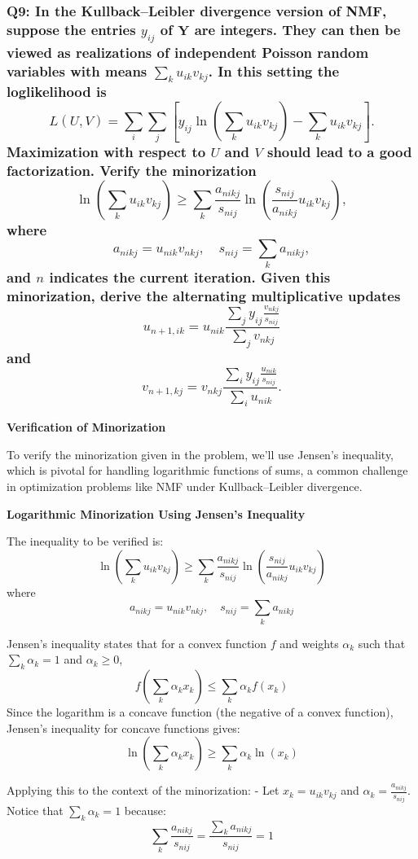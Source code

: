 \documentclass[8pt]{article}
\begin{document}
{\subsubsection*{Q9: In the Kullback–Leibler divergence version of NMF, suppose the entries \(y_{ij}\) of \(\mathbf{Y}\) are integers. They can then be viewed as realizations of independent Poisson random variables with means \(\sum_k u_{ik}v_{kj}\). In this setting the loglikelihood is
\[
L(U, V) = \sum_i \sum_j \left[ y_{ij} \ln \left( \sum_k u_{ik}v_{kj} \right) - \sum_k u_{ik}v_{kj} \right].
\]
\noindent Maximization with respect to \(U\) and \(V\) should lead to a good factorization. Verify the minorization
\[
\ln \left( \sum_k u_{ik}v_{kj} \right) \geq \sum_k \frac{a_{nikj}}{s_{nij}} \ln \left( \frac{s_{nij}}{a_{nikj}} u_{ik}v_{kj} \right),
\]
\noindent where
\[
a_{nikj} = u_{nik}v_{nkj}, \quad s_{nij} = \sum_k a_{nikj},
\]
\noindent and \(n\) indicates the current iteration. Given this minorization, derive the alternating multiplicative updates
\[
u_{n+1,ik} = u_{nik} \frac{\sum_j y_{ij} \frac{v_{nkj}}{s_{nij}}}{\sum_j v_{nkj}}
\]
\noindent and
\[
v_{n+1,kj} = v_{nkj} \frac{\sum_i y_{ij} \frac{u_{nik}}{s_{nij}}}{\sum_i u_{nik}}.
\]}

\textbf{Verification of Minorization}

To verify the minorization given in the problem, we'll use Jensen's inequality, which is pivotal for handling logarithmic functions of sums, a common challenge in optimization problems like NMF under Kullback–Leibler divergence.

\textbf{Logarithmic Minorization Using Jensen's Inequality}

The inequality to be verified is:
\[
\ln \left( \sum_k u_{ik}v_{kj} \right) \geq \sum_k \frac{a_{nikj}}{s_{nij}} \ln \left( \frac{s_{nij}}{a_{nikj}} u_{ik}v_{kj} \right)
\]
where
\[
a_{nikj} = u_{nik}v_{nkj}, \quad s_{nij} = \sum_k a_{nikj}
\]

Jensen's inequality states that for a convex function \( f \) and weights \( \alpha_k \) such that \( \sum_k \alpha_k = 1 \) and \( \alpha_k \geq 0 \),
\[
f\left(\sum_k \alpha_k x_k\right) \leq \sum_k \alpha_k f(x_k)
\]
Since the logarithm is a concave function (the negative of a convex function), Jensen's inequality for concave functions gives:
\[
\ln\left(\sum_k \alpha_k x_k\right) \geq \sum_k \alpha_k \ln(x_k)
\]

Applying this to the context of the minorization:
- Let \( x_k = u_{ik}v_{kj} \) and \( \alpha_k = \frac{a_{nikj}}{s_{nij}} \). Notice that \( \sum_k \alpha_k = 1 \) because:
\[
\sum_k \frac{a_{nikj}}{s_{nij}} = \frac{\sum_k a_{nikj}}{s_{nij}} = 1
\]

}
\end{document}
